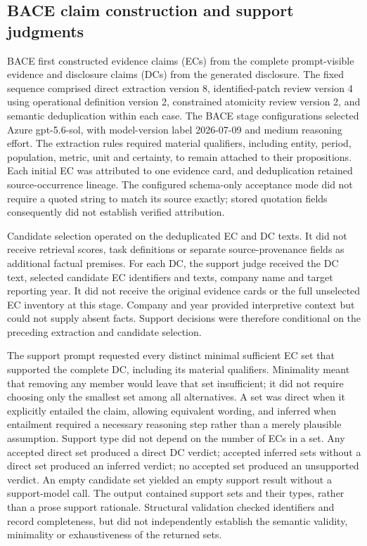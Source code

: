 \documentclass[11pt,a4paper]{article}
\begin{document}
\subsection*{BACE claim construction and support judgments}

BACE first constructed evidence claims (ECs) from the complete prompt-visible evidence and disclosure claims (DCs) from the generated disclosure. The fixed sequence comprised direct extraction version 8, identified-patch review version 4 using operational definition version 2, constrained atomicity review version 2, and semantic deduplication within each case. The BACE stage configurations selected Azure gpt-5.6-sol, with model-version label 2026-07-09 and medium reasoning effort. The extraction rules required material qualifiers, including entity, period, population, metric, unit and certainty, to remain attached to their propositions. Each initial EC was attributed to one evidence card, and deduplication retained source-occurrence lineage. The configured schema-only acceptance mode did not require a quoted string to match its source exactly; stored quotation fields consequently did not establish verified attribution.

Candidate selection operated on the deduplicated EC and DC texts. It did not receive retrieval scores, task definitions or separate source-provenance fields as additional factual premises. For each DC, the support judge received the DC text, selected candidate EC identifiers and texts, company name and target reporting year. It did not receive the original evidence cards or the full unselected EC inventory at this stage. Company and year provided interpretive context but could not supply absent facts. Support decisions were therefore conditional on the preceding extraction and candidate selection.

The support prompt requested every distinct minimal sufficient EC set that supported the complete DC, including its material qualifiers. Minimality meant that removing any member would leave that set insufficient; it did not require choosing only the smallest set among all alternatives. A set was direct when it explicitly entailed the claim, allowing equivalent wording, and inferred when entailment required a necessary reasoning step rather than a merely plausible assumption. Support type did not depend on the number of ECs in a set. Any accepted direct set produced a direct DC verdict; accepted inferred sets without a direct set produced an inferred verdict; no accepted set produced an unsupported verdict. An empty candidate set yielded an empty support result without a support-model call. The output contained support sets and their types, rather than a prose support rationale. Structural validation checked identifiers and record completeness, but did not independently establish the semantic validity, minimality or exhaustiveness of the returned sets.
\end{document}
